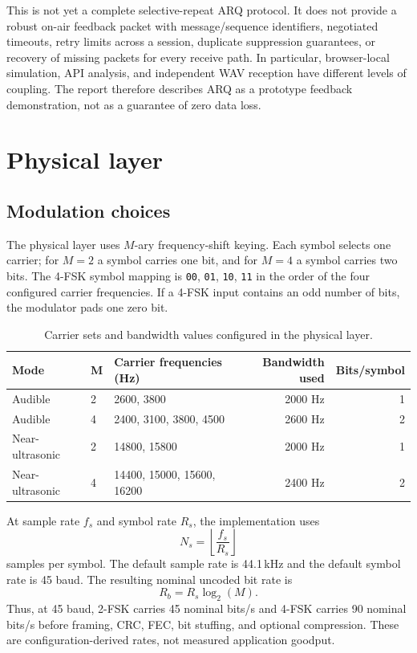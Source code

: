 \documentclass[11pt,a4paper]{article}
\begin{document}
This is not yet a complete selective-repeat ARQ protocol. It does not provide a robust on-air feedback packet with message/sequence identifiers, negotiated timeouts, retry limits across a session, duplicate suppression guarantees, or recovery of missing packets for every receive path. In particular, browser-local simulation, API analysis, and independent WAV reception have different levels of coupling. The report therefore describes ARQ as a prototype feedback demonstration, not as a guarantee of zero data loss.

\section{Physical layer}
\label{sec:phy}

\subsection{Modulation choices}
The physical layer uses $M$-ary frequency-shift keying. Each symbol selects one carrier; for $M=2$ a symbol carries one bit, and for $M=4$ a symbol carries two bits. The 4-FSK symbol mapping is \texttt{00}, \texttt{01}, \texttt{10}, \texttt{11} in the order of the four configured carrier frequencies. If a 4-FSK input contains an odd number of bits, the modulator pads one zero bit.

\begin{table}[ht]
\centering
\begin{tabularx}{\textwidth}{@{}llXrr@{}}
\toprule
\textbf{Mode} & \textbf{M} & \textbf{Carrier frequencies (Hz)} & \textbf{Bandwidth used} & \textbf{Bits/symbol}\\
\midrule
Audible & 2 & 2600, 3800 & 2000 Hz & 1\\
Audible & 4 & 2400, 3100, 3800, 4500 & 2600 Hz & 2\\
Near-ultrasonic & 2 & 14800, 15800 & 2000 Hz & 1\\
Near-ultrasonic & 4 & 14400, 15000, 15600, 16200 & 2400 Hz & 2\\
\bottomrule
\end{tabularx}
\caption{Carrier sets and bandwidth values configured in the physical layer.}
\label{tab:tones}
\end{table}

At sample rate $f_s$ and symbol rate $R_s$, the implementation uses
\[
    N_s=\left\lfloor\frac{f_s}{R_s}\right\rfloor
\]
samples per symbol. The default sample rate is 44.1\,kHz and the default symbol rate is 45 baud. The resulting nominal uncoded bit rate is
\[
    R_b=R_s\log_2(M).
\]
Thus, at 45 baud, 2-FSK carries 45 nominal bits/s and 4-FSK carries 90 nominal bits/s before framing, CRC, FEC, bit stuffing, and optional compression. These are configuration-derived rates, not measured application goodput.
\end{document}
